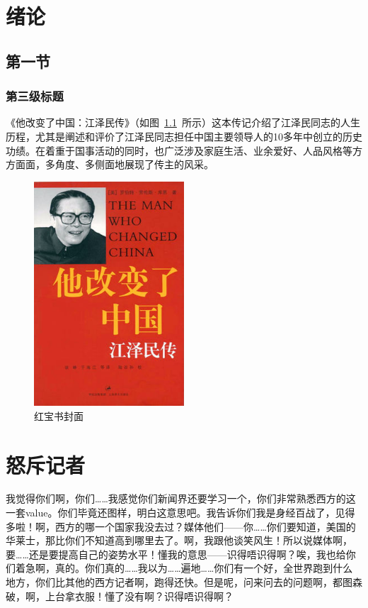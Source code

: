 \baselineskip=20pt
\chapter{绪论}
\section{第一节}
\subsection{第三级标题}
《他改变了中国：江泽民传》（如图~\ref{book}~所示）这本传记介绍了江泽民同志的人生历程，尤其是阐述和评价了江泽民同志担任中国主要领导人的10多年中创立的历史功绩。在着重于国事活动的同时，也广泛涉及家庭生活、业余爱好、人品风格等方方面面，多角度、多侧面地展现了传主的风采。

	\begin{figure}[htbp!]
		\centering
		\includegraphics[width=0.5\textwidth]{figures/The_Man_Who_Changed_China.png}
		\caption{红宝书封面}\label{book}
		\vspace{-1em}
	\end{figure}	



\chapter{怒斥记者}
我觉得你们啊，你们……我感觉你们新闻界还要学习一个，你们非常熟悉西方的这一套value。你们毕竟还图样，明白这意思吧。我告诉你们我是身经百战了，见得多啦！啊，西方的哪一个国家我没去过？媒体他们——你……你们要知道，美国的华莱士，那比你们不知道高到哪里去了。啊，我跟他谈笑风生！所以说媒体啊，要……还是要提高自己的姿势水平！懂我的意思——识得唔识得啊？唉，我也给你们着急啊，真的。你们真的……我以为……遍地……你们有一个好，全世界跑到什么地方，你们比其他的西方记者啊，跑得还快。但是呢，问来问去的问题啊，都图森破，啊，上台拿衣服！懂了没有啊？识得唔识得啊？

